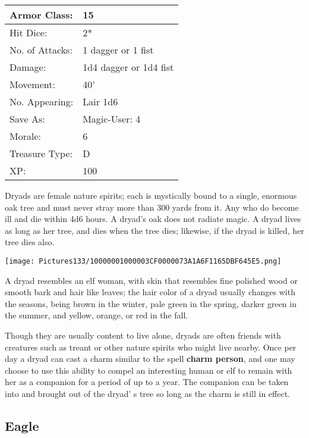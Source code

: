 \documentclass[a4paper,twoside,openany,10pt]{book}
\begin{document}
\begin{multicols}{2}
\begin{tabularx}{0.48\textwidth}{@{}lX@{}}
Armor Class: & 15 \\\hline
Hit Dice: & 2* \\\hline
No. of Attacks: & 1 dagger or 1 fist \\\hline
Damage: & 1d4 dagger or 1d4 fist \\\hline
Movement: & 40' \\\hline
No. Appearing: & Lair 1d6 \\\hline
Save As: & Magic-User: 4 \\\hline
Morale: & 6 \\\hline
Treasure Type: & D \\\hline
XP: & 100 \\\hline
\end{tabularx}\medskip

Dryads are female nature spirits; each is mystically bound to a single, enormous oak tree and must never stray more than 300 yards from it. Any who do become ill and die within 4d6 hours. A dryad's oak does not radiate magic. A dryad lives as long as her tree, and dies when the tree dies; likewise, if the dryad is killed, her tree dies also.

\begin{center}
	\texttt{[image: Pictures133/10000001000003CF0000073A1A6F1165DBF645E5.png]}\medskip
\end{center}


A dryad resembles an elf woman, with skin that resembles fine polished wood or smooth bark and hair like leaves; the hair color of a dryad usually changes with the seasons, being brown in the winter, pale green in the spring, darker green in the summer, and yellow, orange, or red in the fall.

Though they are usually content to live alone, dryads are often friends with creatures such as treant or other nature spirits who might live nearby. Once per day a dryad can cast a charm similar to the spell \textbf{charm person}, and one may choose to use this ability to compel an interesting human or elf to remain with her as a companion for a period of up to a year. The companion can be taken into and brought out of the dryad' s tree so long as the charm is still in effect.\\


\subsection*{Eagle}\label{eagle}


\end{multicols}
\end{document}
